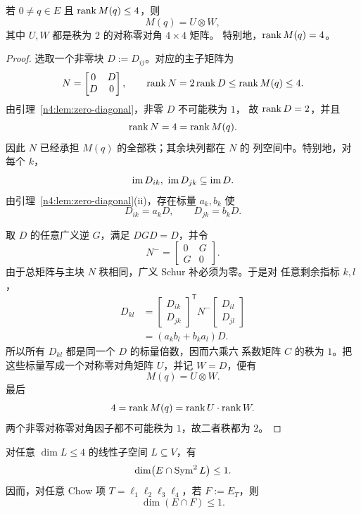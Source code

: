 \begin{theorem}\label{n4:thm:rank-four-classification}
若 \(0\neq q\in E\) 且 \(\operatorname{rank} M(q)\leq4\)，则
\[
  M(q)=U\otimes W,
\]
其中 \(U,W\) 都是秩为 \(2\) 的对称零对角 \(4\times4\) 矩阵。
特别地，\(\operatorname{rank} M(q)=4\)。
\end{theorem}

\begin{proof}
选取一个非零块 \(D:=D_{ij}\)。对应的主子矩阵为
\[
  N=\begin{bmatrix}0&D\\D&0\end{bmatrix},
  \qquad \operatorname{rank} N=2\operatorname{rank} D\leq\operatorname{rank} M(q)\leq4.
\]
由引理~\ref{n4:lem:zero-diagonal}，非零 \(D\) 不可能秩为 \(1\)，
故 \(\operatorname{rank} D=2\)，并且
\[
  \operatorname{rank} N=4=\operatorname{rank} M(q).
\]
因此 \(N\) 已经承担 \(M(q)\) 的全部秩；其余块列都在 \(N\) 的
列空间中。特别地，对每个 \(k\)，
\[
  \operatorname{im} D_{ik},\ \operatorname{im} D_{jk}\subseteq\operatorname{im} D.
\]
由引理~\ref{n4:lem:zero-diagonal}(ii)，存在标量 \(a_k,b_k\) 使
\[
  D_{ik}=a_kD,\qquad D_{jk}=b_kD.
\]

取 \(D\) 的任意广义逆 \(G\)，满足 \(DGD=D\)，并令
\[
  N^-=\begin{bmatrix}0&G\\G&0\end{bmatrix}.
\]
由于总矩阵与主块 \(N\) 秩相同，广义 Schur 补必须为零。于是对
任意剩余指标 \(k,l\)，
\begin{align*}
  D_{kl}
  &=
  \begin{bmatrix}D_{ik}\\D_{jk}\end{bmatrix}^{\mathsf T}
  N^-
  \begin{bmatrix}D_{il}\\D_{jl}\end{bmatrix}  \\
  &=(a_kb_l+b_ka_l)D.
\end{align*}
所以所有 \(D_{kl}\) 都是同一个 \(D\) 的标量倍数，因而六乘六
系数矩阵 \(C\) 的秩为 \(1\)。把这些标量写成一个对称零对角矩阵
\(U\)，并记 \(W=D\)，便有
\[
  M(q)=U\otimes W.
\]
最后
\[
  4=\operatorname{rank} M(q)=\operatorname{rank} U\cdot\operatorname{rank} W.
\]
两个非零对称零对角因子都不可能秩为 \(1\)，故二者秩都为 \(2\)。
\end{proof}

\begin{corollary}\label{n4:cor:intersection}
对任意 \(\dim L\leq4\) 的线性子空间 \(L\subseteq V\)，有
\[
  \dim\bigl(E\cap\operatorname{Sym}^2L\bigr)\leq1.
\]
因而，对任意 Chow 项 \(T=\ell_1\ell_2\ell_3\ell_4\)，若
\(F:=E_T\)，则
\[
  \dim(E\cap F)\leq1.
\]
\end{corollary}

